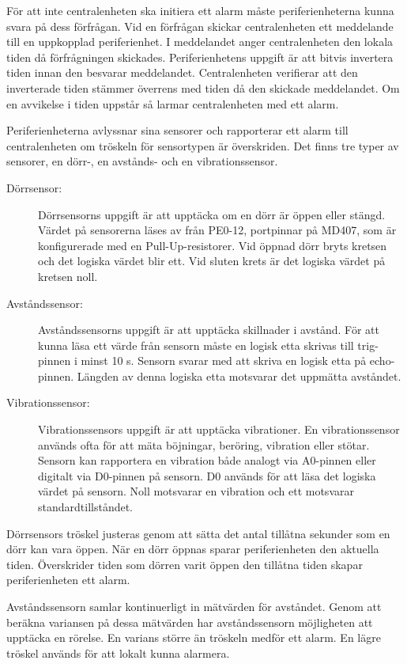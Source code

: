 \documentclass[a4paper]{article}
\begin{document}
För att inte centralenheten ska initiera ett alarm måste periferienheterna kunna svara på dess förfrågan.
Vid en förfrågan skickar centralenheten ett meddelande till en uppkopplad periferienhet.
I meddelandet anger centralenheten den lokala tiden då förfrågningen skickades.
Periferienhetens uppgift är att bitvis invertera tiden innan den besvarar meddelandet.
Centralenheten verifierar att den inverterade tiden stämmer överrens med tiden då den skickade meddelandet.
Om en avvikelse i tiden uppstår så larmar centralenheten med ett alarm.

Periferienheterna avlyssnar sina sensorer och rapporterar ett alarm till centralenheten om tröskeln för sensortypen är överskriden.
Det finns tre typer av sensorer, en dörr-, en avstånds- och en vibrationssensor.

\begin{description}
    \item[Dörrsensor:] Dörrsensorns uppgift är att upptäcka om en dörr är öppen eller stängd.
    Värdet på sensorerna läses av från PE0-12, portpinnar på MD407, som är konfigurerade med en Pull-Up-resistorer.
    Vid öppnad dörr bryts kretsen och det logiska värdet blir ett.
    Vid sluten krets är det logiska värdet på kretsen noll.

    \item[Avståndssensor:] Avståndssensorns uppgift är att upptäcka skillnader i avstånd.
    För att kunna läsa ett värde från sensorn måste en logisk etta skrivas till trig-pinnen i minst 10 \textmu s.
    Sensorn svarar med att skriva en logisk etta på echo-pinnen.
    Längden av denna logiska etta motsvarar det uppmätta avståndet.

    \item[Vibrationssensor:] Vibrationssensors uppgift är att upptäcka vibrationer.
    En vibrationssensor används ofta för att mäta böjningar, beröring, vibration eller stötar.
    Sensorn kan rapportera en vibration både analogt via A0-pinnen eller digitalt via D0-pinnen på sensorn.
    D0 används för att läsa det logiska värdet på sensorn.
    Noll motsvarar en vibration och ett motsvarar standardtillståndet.
\end{description}

Dörrsensors tröskel justeras genom att sätta det antal tillåtna sekunder som en dörr kan vara öppen.
När en dörr öppnas sparar periferienheten den aktuella tiden.
Överskrider tiden som dörren varit öppen den tillåtna tiden skapar periferienheten ett alarm.

Avståndssensorn samlar kontinuerligt in mätvärden för avståndet.
Genom att beräkna variansen på dessa mätvärden har avståndssensorn möjligheten att upptäcka en rörelse.
En varians större än tröskeln medför ett alarm.
En lägre tröskel används för att lokalt kunna alarmera.
\end{document}
